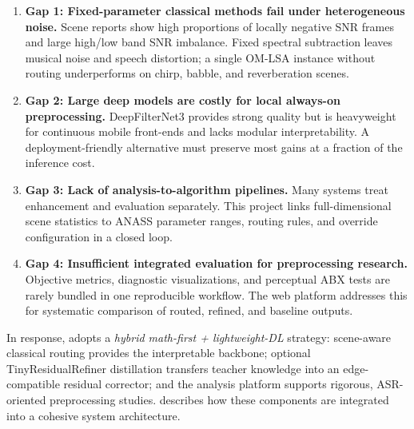 \begin{enumerate}
  \item \textbf{Gap 1: Fixed-parameter classical methods fail under heterogeneous noise.}
  Scene reports show high proportions of locally negative SNR frames and large high/low band SNR imbalance. Fixed spectral subtraction leaves musical noise and speech distortion; a single OM-LSA instance without routing underperforms on chirp, babble, and reverberation scenes.

  \item \textbf{Gap 2: Large deep models are costly for local always-on preprocessing.}
  DeepFilterNet3 provides strong quality but is heavyweight for continuous mobile front-ends and lacks modular interpretability. A deployment-friendly alternative must preserve most gains at a fraction of the inference cost.

  \item \textbf{Gap 3: Lack of analysis-to-algorithm pipelines.}
  Many systems treat enhancement and evaluation separately. This project links full-dimensional scene statistics to ANASS parameter ranges, routing rules, and override configuration in a closed loop.

  \item \textbf{Gap 4: Insufficient integrated evaluation for preprocessing research.}
  Objective metrics, diagnostic visualizations, and perceptual ABX tests are rarely bundled in one reproducible workflow. The web platform addresses this for systematic comparison of routed, refined, and baseline outputs.
\end{enumerate}

In response, \projectshort{} adopts a \emph{hybrid math-first + lightweight-DL} strategy: scene-aware classical routing provides the interpretable backbone; optional TinyResidualRefiner distillation transfers teacher knowledge into an edge-compatible residual corrector; and the analysis platform supports rigorous, ASR-oriented preprocessing studies.  describes how these components are integrated into a cohesive system architecture.
